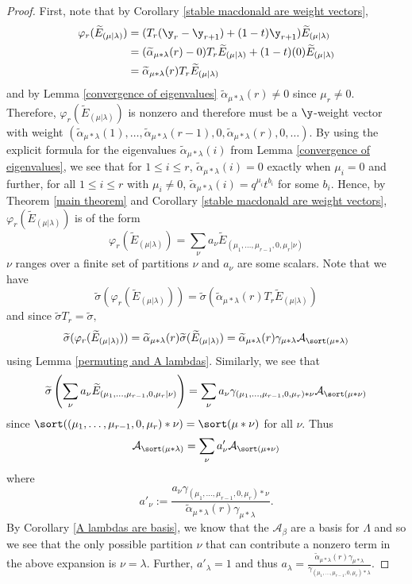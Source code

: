 \begin{proof}
First, note that by Corollary \ref{stable macdonald are weight vectors},
\begin{align*}
    \varphi_r(\widetilde{E}_{(\mu|\lambda)}) &= (T_r(\y_r-\y_{r+1})+(1-t)\y_{r+1})\widetilde{E}_{(\mu|\lambda)} \\
    &= (\widetilde{\alpha}_{\mu*\lambda}(r)-0)T_r\widetilde{E}_{(\mu|\lambda)} + (1-t)(0)\widetilde{E}_{(\mu|\lambda)}\\
    &= \widetilde{\alpha}_{\mu*\lambda}(r)T_r\widetilde{E}_{(\mu|\lambda)}
\end{align*}
and by Lemma \ref{convergence of eigenvalues} $\widetilde{\alpha}_{\mu*\lambda}(r) \neq 0$ since $\mu_r \neq 0$. Therefore, $\varphi_r(\widetilde{E}_{(\mu|\lambda)})$ is nonzero and therefore must be a $\y$-weight vector with weight $(\widetilde{\alpha}_{\mu*\lambda}(1),\ldots,\widetilde{\alpha}_{\mu*\lambda}(r-1),0,\widetilde{\alpha}_{\mu*\lambda}(r), 0,\ldots)$. By using the explicit formula for the eigenvalues $\widetilde{\alpha}_{\mu*\lambda}(i)$ from Lemma \ref{convergence of eigenvalues}, we see that for $1 \leq i \leq r$, $\widetilde{\alpha}_{\mu*\lambda}(i) = 0$ exactly when $\mu_i = 0$ and further, for all $1 \leq i \leq r$ with $\mu_i \neq 0$, $\widetilde{\alpha}_{\mu*\lambda}(i) = q^{\mu_i}t^{b_i}$ for some $b_i$. Hence, by Theorem \ref{main theorem} and Corollary \ref{stable macdonald are weight vectors}, $\varphi_r(\widetilde{E}_{(\mu|\lambda)})$ is of the form 
$$\varphi_r(\widetilde{E}_{(\mu|\lambda)}) = \sum_{\nu} a_{\nu} \widetilde{E}_{(\mu_1,\ldots,\mu_{r-1},0,\mu_r|\nu)}$$
$\nu$ ranges over a finite set of partitions $\nu$ and $a_{\nu}$ are some scalars. 
Note that we have 
$$\widetilde{\sigma}(\varphi_r(\widetilde{E}_{(\mu|\lambda)})) =  \widetilde{\sigma}(\widetilde{\alpha}_{\mu*\lambda}(r)T_r\widetilde{E}_{(\mu|\lambda)}) $$ and since $\widetilde{\sigma}T_r = \widetilde{\sigma},$ $$\widetilde{\sigma}(\varphi_r(\widetilde{E}_{(\mu|\lambda)}))= \widetilde{\alpha}_{\mu*\lambda}(r)\widetilde{\sigma}(\widetilde{E}_{(\mu|\lambda)}) = \widetilde{\alpha}_{\mu*\lambda}(r) \gamma_{\mu*\lambda} \mathcal{A}_{\sort(\mu*\lambda)}$$ 
using Lemma \ref{permuting and A lambdas}. 
Similarly, we see that 
$$\widetilde{\sigma}\left( \sum_{\nu} a_{\nu} \widetilde{E}_{(\mu_1,\ldots,\mu_{r-1},0,\mu_r|\nu)}   \right) = \sum_{\nu} a_{\nu} \gamma_{(\mu_1,\ldots,\mu_{r-1},0,\mu_r)*\nu} \mathcal{A}_{\sort(\mu*\nu)}$$
since $\sort((\mu_1,\ldots,\mu_{r-1},0,\mu_r)*\nu) = \sort(\mu*\nu)$ for all $\nu.$ Thus
$$\mathcal{A}_{\sort(\mu*\lambda)} = \sum_{\nu} a_{\nu}' \mathcal{A}_{\sort(\mu*\nu)} $$
where $$a'_{\nu}:= \frac{a_{\nu}\gamma_{(\mu_1,\ldots,\mu_{r-1},0,\mu_r)*\nu}}{\widetilde{\alpha}_{\mu*\lambda}(r)\gamma_{\mu*\lambda}}.$$ By Corollary \ref{A lambdas are basis}, we know that the $\mathcal{A}_{\beta}$ are a basis for $\Lambda$ and so we see that the only possible partition $\nu$ that can contribute a nonzero term in the above expansion is $\nu = \lambda$. Further, $a'_{\lambda} = 1$ and thus $a_{\lambda} = \frac{\widetilde{\alpha}_{\mu*\lambda}(r)\gamma_{\mu*\lambda}}{\gamma_{(\mu_1,\ldots,\mu_{r-1},0,\mu_r)*\lambda}}.$


\end{proof}
